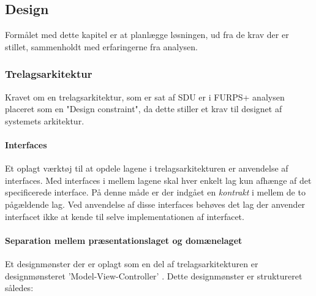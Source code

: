 \subsection{Design}

Formålet med dette kapitel er at planlægge løsningen, ud fra de krav der er
stillet, sammenholdt med erfaringerne fra analysen.


\subsubsection{Trelagsarkitektur}%
\label{ssub:3_lags_arkiteturen}

Kravet om en trelagsarkitektur, som er sat af SDU er i FURPS+ analysen placeret som en "Design constraint", da dette stiller et krav til designet af systemets arkitektur. 


\paragraph{Interfaces} Et oplagt værktøj til at opdele lagene i
trelagsarkitekturen er anvendelse af interfaces. Med interfaces i mellem lagene 
skal hver enkelt lag kun afhænge af det specificerede interface. På denne måde
er der indgået en \emph{kontrakt} i mellem de to pågældende lag.
Ved anvendelse af disse interfaces behøves det lag der anvender interfacet ikke
at kende til selve implementationen af interfacet.

\paragraph{Separation mellem præsentationslaget og domænelaget}

Et designmønster der er oplagt som en del af trelagsarkitekturen er
designmønsteret 'Model-View-Controller'\cite[p. 176]{} . Dette designmønster er struktureret
således:

